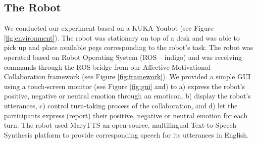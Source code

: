 \documentclass[12pt]{report}
\begin{document}
\subsection{The Robot}

We conducted our experiment based on a KUKA Youbot (see Figure
\ref{fig:environment}). The robot was stationary on top of a desk and was able
to pick up and place available pegs corresponding to the robot's task. The robot
was operated based on Robot Operating System (ROS -- indigo) and was receiving
commands through the ROS-bridge from our Affective Motivational Collaboration
framework (see Figure \ref{fig:framework}). We provided a simple GUI using a
touch-screen monitor (see Figure \ref{fig:gui} and) to a) express the robot's
positive, negative or neutral emotion through an emoticon, b) display the
robot's utterances, c) control turn-taking process of the collaboration, and d)
let the participants express (report) their positive, negative or neutral
emotion for each turn. The robot used MaryTTS an open-source, multilingual
Text-to-Speech Synthesis platform to provide corresponding speech for its
utterances in English.
\end{document}
